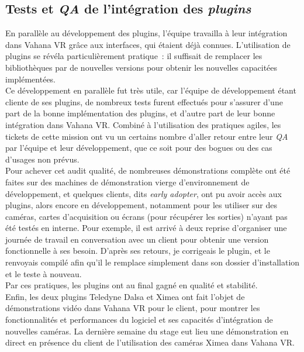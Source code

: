 \subsection{Tests et \textit{QA} de l'intégration des \textit{plugins}}
En parallèle au développement des plugins, l'équipe travailla à leur intégration
dans Vahana VR grâce aux interfaces, qui étaient déjà connues. L'utilisation de plugins
se révéla particulièrement pratique~: il suffisait de remplacer les bibliothèques par de nouvelles versions pour
obtenir les nouvelles capacitées implémentées.\\
\newline
Ce développement en parallèle fut très utile, car l'équipe de développement étant 
cliente de ses plugins, de nombreux tests furent effectués pour s'assurer d'une part 
de la bonne implémentation des plugins, et d'autre part de leur bonne intégration dans Vahana VR.
Combiné à l'utilisation des pratiques agiles, les tickets de cette mission ont vu
un certains nombre d'aller retour entre leur \textit{QA} par l'équipe et leur développement,
que ce soit pour des bogues ou des cas d'usages non prévus.\\
Pour achever cet audit qualité, de nombreuses démonstrations complète ont été faites
sur des machines de démonstration vierge d'environnement de développement, et quelques
clients, dits \textit{early adopter}, ont pu avoir accès aux plugins, alors encore en
développement, notamment pour les utiliser sur des caméras, cartes d'acquisition ou
écrans (pour récupérer les sorties) n'ayant pas été testés en interne. Pour exemple,
il est arrivé à deux reprise d'organiser une journée de travail en conversation
avec un client pour obtenir une version fonctionnelle à ses besoin. D'après ses
retours, je corrigeais le plugin, et le renvoyais compilé afin qu'il le remplace
simplement dans son dossier d'installation et le teste à nouveau.\\
Par ces pratiques, les plugins ont au final gagné en qualité et stabilité.\\
\newline
Enfin, les deux plugins Teledyne Dalsa et Ximea ont fait l'objet de démonstrations
vidéo dans Vahana VR pour le client, pour montrer les fonctionnalités et performances
du logiciel et ses capacités d'intégration de nouvelles caméras. La dernière semaine
du stage eut lieu une démonstration en direct en présence du client de l'utilisation
des caméras Ximea dans Vahana VR.

